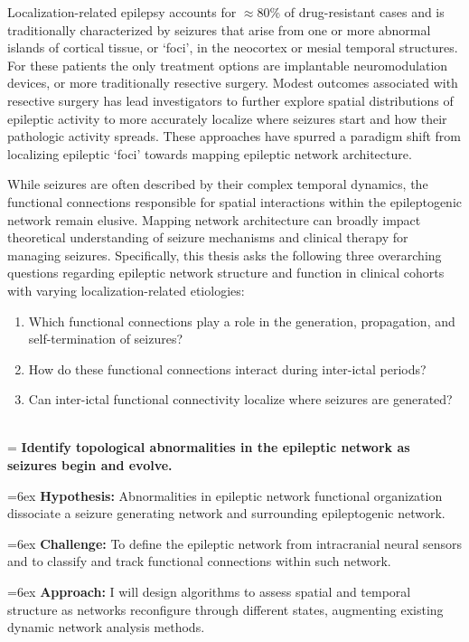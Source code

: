 Localization-related epilepsy accounts for $\approx$80\% of drug-resistant cases and is traditionally characterized by seizures that arise from one or more abnormal islands of cortical tissue, or `foci', in the neocortex or mesial temporal structures. For these patients the only treatment options are implantable neuromodulation devices, or more traditionally resective surgery. Modest outcomes associated with resective surgery has lead investigators to further explore spatial distributions of epileptic activity to more accurately localize where seizures start and how their pathologic activity spreads. These approaches have spurred a paradigm shift from localizing epileptic ‘foci’ towards mapping epileptic network architecture.

While seizures are often described by their complex temporal dynamics, the functional connections responsible for spatial interactions within the epileptogenic network remain elusive. Mapping network architecture can broadly impact theoretical understanding of seizure mechanisms and clinical therapy for managing seizures.
Specifically, this thesis asks the following three overarching questions regarding epileptic network structure and function in clinical cohorts with varying localization-related etiologies:
\begin{enumerate}[topsep=1ex, itemsep=0pt]
    \item Which functional connections play a role in the generation, propagation, and self-termination of seizures?
    \item How do these functional connections interact during inter-ictal periods?
    \item Can inter-ictal functional connectivity localize where seizures are generated?
\end{enumerate}

~\\
\hangindent=\parindent
{}
\noindent
{} \textbf{Identify topological abnormalities in the epileptic network as seizures begin and evolve.}

\hangindent=6ex
\textbf{Hypothesis:} Abnormalities in epileptic network functional organization dissociate a seizure generating network and surrounding epileptogenic network.

\hangindent=6ex
\textbf{Challenge:} To define the epileptic network from intracranial neural sensors and to classify and track functional connections within such network.

\hangindent=6ex
\textbf{Approach:} I will design algorithms to assess spatial and temporal structure as networks reconfigure through different states, augmenting existing dynamic network analysis methods.

